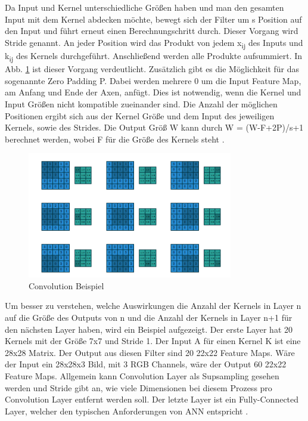 \documentclass{llncs}
\begin{document}
\\\\
Da Input und Kernel unterschiedliche Größen haben und man den gesamten Input mit dem Kernel abdecken möchte, bewegt sich der Filter um s Position auf den Input und führt erneut einen Berechnungschritt durch. Dieser Vorgang wird Stride genannt. An jeder Position wird das Produkt von jedem x\textsubscript{ij} des Inputs und k\textsubscript{ij} des Kernels durchgeführt.  Anschließend werden alle Produkte aufsummiert. In Abb. \ref{fig:Bild11} ist dieser Vorgang verdeutlicht. Zusätzlich gibt es die Möglichkeit für das sogenannte Zero Padding P. Dabei werden mehrere 0 um die Input Feature Map, am Anfang und Ende der Axen, anfügt. Dies ist notwendig, wenn die Kernel und Input Größen nicht kompatible zueinander sind. Die Anzahl der möglichen Positionen ergibt sich aus der Kernel Größe und dem Input des jeweiligen Kernels, sowie des Strides. Die Output Größ W kann durch W = (W-F+2P)/s+1 berechnet werden, wobei F für die Größe des Kernels steht \cite{conv}.
\pagebreak\linebreak 
\begin{figure}
	\centering
	\includegraphics[width=0.8\textwidth]{conv.png}
	\caption{Convolution Beispiel\protect\cite{conv}}
	\label{fig:Bild11}
\end{figure}
Um  besser zu verstehen, welche Auswirkungen die Anzahl der Kernels in Layer n auf die Größe des Outputs von n und die Anzahl der Kernels in Layer n+1 für den nächsten Layer haben, wird ein Beispiel aufgezeigt. Der erste Layer hat 20 Kernels mit der Größe 7x7 und Stride 1. Der Input A für einen Kernel K ist eine 28x28 Matrix. Der Output aus diesen Filter sind 20 22x22 Feature Maps. Wäre der Input ein 28x28x3 Bild, mit 3 RGB Channels, wäre der Output 60 22x22 Feature Maps. Allgemein kann Convolution Layer als Supsampling gesehen werden und Stride gibt an, wie viele Dimensionen bei diesem Prozess pro Convolution Layer entfernt werden soll. Der letzte Layer ist ein Fully-Connected Layer, welcher den typischen Anforderungen von ANN entspricht \cite{conv}.  
\end{document}
